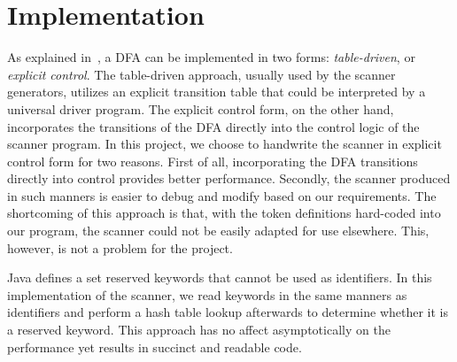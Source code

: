 \section{Implementation}

As explained in~\cite{fischer2009crafting}, a DFA can be implemented in two forms: \emph{table-driven}, or \emph{explicit control}. The table-driven approach, usually used by the scanner generators, utilizes an explicit transition table that could be interpreted by a universal driver program. The explicit control form, on the other hand, incorporates the transitions of the DFA directly into the control logic of the scanner program. In this project, we choose to handwrite the scanner in explicit control form for two reasons. First of all, incorporating the DFA transitions directly into control provides better performance. Secondly, the scanner produced in such manners is easier to debug and modify based on our requirements. The shortcoming of this approach is that, with the token definitions hard-coded into our program, the scanner could not be easily adapted for use elsewhere. This, however, is not a problem for the project.

Java defines a set reserved keywords that cannot be used as identifiers. In this implementation of the scanner, we read keywords in the same manners as identifiers and perform a hash table lookup afterwards to determine whether it is a reserved keyword. This approach has no affect asymptotically on the performance yet results in succinct and readable code.

